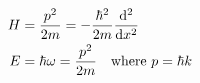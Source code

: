 

\vspace*{\fill}
\centering

\begin{align*}
    H &= \frac{p^2}{2m} = -\frac{\hbar^2}{2m}\dv[2]{x} \\
    E &= \hbar\omega = \frac{p^2}{2m} \quad \mbox{where } p = \hbar k
\end{align*}

\centering
\vspace*{\fill}

